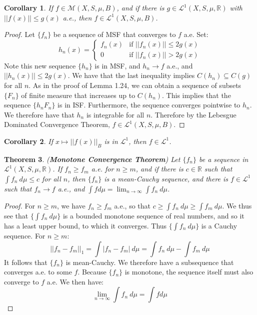 \documentclass[a4paper,12pt]{report}
\newcommand{\ms}[1]{\mathscr{#1}}
\newcommand{\sse} {\subseteq}
\newtheorem{theorem}{Theorem}[section]
\newtheorem{corollary}[theorem]{Corollary}
\begin{document}
	\begin{corollary}
	If $f \in \ms{M}(X, S, \mu, B)$, and if there is $g \in \ms{L}^1(X, S, \mu, \mathbb{R})$ with $||f(x)|| \leq g(x)$ a.e., then $f \in \ms{L}^1(X, S, \mu ,B)$. 
	\end{corollary}
	\begin{proof}
	Let $\{f_n\}$ be a sequence of MSF that converges to $f$ a.e. Set:
	\[ h_n(x) = \begin{cases}
				f_n(x) & \text{if } ||f_n(x)|| \leq 2g(x) \\
				0 & \text{if } ||f_n(x)|| > 2g(x) 
				\end{cases} \]
	Note this new sequence $\{h_n\}$ is in MSF, and $h_n \rightarrow f$ a.e., and $||h_n(x)|| \leq 2g(x)$. We have that the last inequality implies $C(h_n) \sse C(g)$ for all $n$. As in the proof of Lemma 1.24, we can obtain a sequence of subsets $\{F_n\}$ of finite measure that increases up to $C(h_n)$. This implies that the sequence $\{h_nF_n\}$ is in ISF. Furthermore, the sequence converges pointwise to $h_n$. We therefore have that $h_n$ is integrable for all $n$. Therefore by the Lebesgue Dominated Convergence Theorem, $f \in \ms{L}^1(X, S, \mu, B)$. 
	\end{proof}
	
	\begin{corollary}
	If $x \mapsto ||f(x)||_B$ is in $\ms{L}^1$, then $f \in \ms{L}^1$. 
	\end{corollary}
	
	\begin{theorem}
	\emph{(\textbf{Monotone Convergence Theorem})}
	Let $\{f_n\}$ be a sequence in $\ms{L}^1(X, S, \mu, \mathbb{R})$. If $f_n \geq f_m$ a.e. for $n \geq m$, and if there is $c \in \mathbb{R}$ such that $\int f_n ~ d\mu \leq c$ for all $n$, then $\{f_n\}$ is a mean-Cauchy sequence, and there is $f \in \ms{L}^1$ such that $f_n \rightarrow f$ a.e., and $\int f d\mu = \lim_{n \rightarrow \infty} \int f_n ~ d\mu$. 
	\end{theorem}
	\begin{proof}
	For $n \geq m$, we have $f_n \geq f_m$ a.e., so that $c \geq \int f_n ~ d\mu \geq \int f_m ~ d\mu$. We thus see that $\{\int f_n ~ d\mu\}$ is a bounded monotone sequence of real numbers, and so it has a least upper bound, to which it converges. Thus $\{\int f_n ~ d\mu\}$ is a Cauchy sequence. For $n \geq m$:
	\[ ||f_n - f_m||_1 = \int |f_n - f_m| ~ d\mu = \int f_n ~ d\mu - \int f_m ~ d\mu \]
	It follows that $\{f_n\}$ is mean-Cauchy. We therefore have a subsequence that converges a.e. to some $f$. Because $\{f_n\}$ is monotone, the sequence itself must also converge to $f$ a.e. We then have:
	\[ \lim_{n \rightarrow \infty} \int f_n ~ d\mu = \int f d\mu \]
	\end{proof}		 
	
\end{document}
